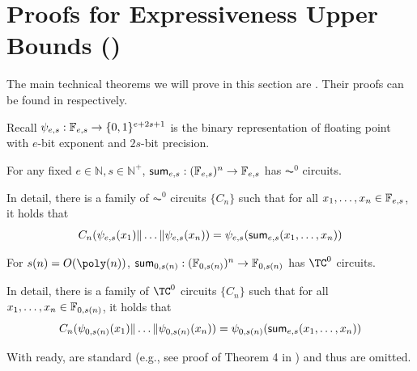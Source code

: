 \section{Proofs for Expressiveness Upper Bounds  ()}\label{appsec:proofs_transformer_upperbound}


The main technical theorems we will prove in this section are . Their proofs can be found in  respectively.  

Recall $\psi_{e,s}:\mathbb{F}_{e,s}\to \{0,1\}^{e+2s+1}$ is the binary representation of floating point with $e$-bit exponent and $2s$-bit precision.
\begin{theorem}\label{thm:iterated_addition_in_AC0}
For any fixed $e\in\mathbb{N},s\in\mathbb{N}^+$, $\mathsf{sum}_{e,s}:(\mathbb{F}_{e,s})^n \to \mathbb{F}_{e,s}$ has $\AC^0$ circuits.
 
 In detail, there is a family of $\AC^0$ circuits $\{C_n\}$ such that for all $x_1,\ldots,x_n \in \mathbb{F}_{e,s}$, it holds that 
	\begin{equation}
		C_n(\psi_{e,s}(x_1)\|\dots\|\psi_{e,s}(x_n)) = \psi_{e,s}(\mathsf{sum}_{e,s}(x_1,\dots,x_n))
	\end{equation}
\end{theorem}

\begin{theorem}\label{thm:iterated_addition_in_TC0}
For $s(n) = O(\poly(n))$, $\mathsf{sum}_{0,s(n)}:(\mathbb{F}_{0,s(n)})^n \to \mathbb{F}_{0,s(n)}$ has $\TC^0$ circuits.
 
 In detail, there is a family of $\TC^0$ circuits $\{C_n\}$ such that for all $x_1,\ldots,x_n \in \mathbb{F}_{0,s(n)}$, it holds that 
	\begin{equation}
		C_n(\psi_{0,s(n)}(x_1)\|\dots\|\psi_{0,s(n)}(x_n)) = \psi_{0,s(n)}(\mathsf{sum}_{e,s}(x_1,\dots,x_n))
	\end{equation}
\end{theorem}

With  ready,  are standard (e.g., see proof of Theorem 4 in \citet{liu2022transformers}) and thus are omitted.




